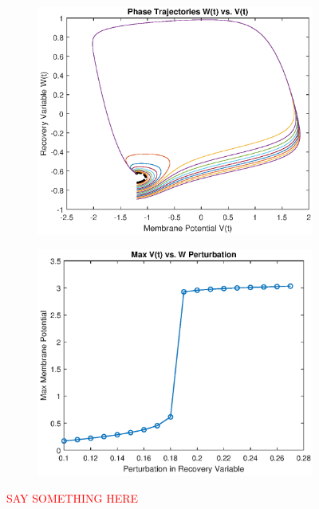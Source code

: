 \documentclass{book}
\theoremstyle{definition}
\begin{document}
\begin{figure}[!htb]
	\centering
	\begin{subfigure}{0.5\textwidth}
		\centering
		\includegraphics[scale=0.6]{FHN_lab/V_W_4.eps}
	\end{subfigure}%
	\begin{subfigure}{0.5\textwidth}
		\centering
		\includegraphics[scale=0.6]{FHN_lab/thres_4.eps}
		
	\end{subfigure}%
	\caption{\textcolor{red}{SAY SOMETHING HERE}}
	\label{Fig:7}
\end{figure}
\end{document}
